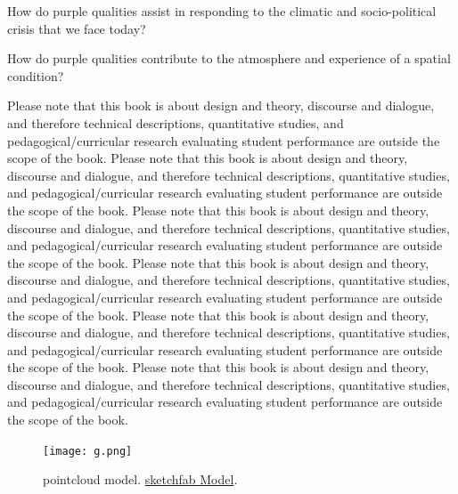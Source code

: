 \documentclass{article}
\newcommand\z{black} %
\begin{document}
How do purple qualities assist in responding to the climatic and socio-political crisis that we face today?

How do purple qualities contribute to the atmosphere and experience of a spatial condition?


Please note that this book is about design and theory, discourse and dialogue, and therefore technical descriptions, quantitative studies, and pedagogical/curricular research evaluating student performance are outside the scope of the book.
Please note that this book is about design and theory, discourse and dialogue, and therefore technical descriptions, quantitative studies, and pedagogical/curricular research evaluating student performance are outside the scope of the book.
Please note that this book is about design and theory, discourse and dialogue, and therefore technical descriptions, quantitative studies, and pedagogical/curricular research evaluating student performance are outside the scope of the book.
Please note that this book is about design and theory, discourse and dialogue, and therefore technical descriptions, quantitative studies, and pedagogical/curricular research evaluating student performance are outside the scope of the book.
Please note that this book is about design and theory, discourse and dialogue, and therefore technical descriptions, quantitative studies, and pedagogical/curricular research evaluating student performance are outside the scope of the book.
Please note that this book is about design and theory, discourse and dialogue, and therefore technical descriptions, quantitative studies, and pedagogical/curricular research evaluating student performance are outside the scope of the book.



\begin{figure}[H]
  \centering
  \captionsetup{font=small,justification=raggedright,singlelinecheck=false}
  \texttt{[image: g.png]}
  \captionsetup{font={small,color=\z}}
  \caption{pointcloud model. \href{https://sketchfab.com/3d-models/wifi-workspace-visualisation-aefe16a1f9bd4296941e099754eaacc2}{sketchfab Model}.}
  \label{fig:method}
\end{figure}
\end{document}
